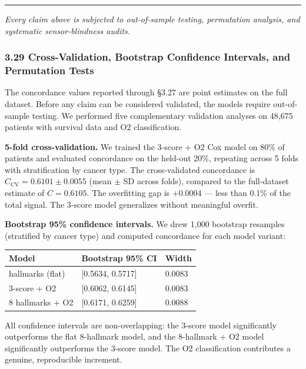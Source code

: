 \documentclass[
  11pt,
]{article}
\newcounter{none} %
\begin{document}
\begin{center}\rule{0.5\linewidth}{0.5pt}\end{center}

\emph{Every claim above is subjected to out-of-sample testing,
permutation analysis, and systematic sensor-blindness audits.}

\subsubsection{3.29 Cross-Validation, Bootstrap Confidence Intervals,
and Permutation
Tests}\label{cross-validation-bootstrap-confidence-intervals-and-permutation-tests}

The concordance values reported through §3.27 are point estimates on the
full dataset. Before any claim can be considered validated, the models
require out-of-sample testing. We performed five complementary
validation analyses on 48,675 patients with survival data and O2
classification.

\textbf{5-fold cross-validation.} We trained the 3-score + O2 Cox model
on 80\% of patients and evaluated concordance on the held-out 20\%,
repeating across 5 folds with stratification by cancer type. The
cross-validated concordance is \(C_\mathrm{CV} = 0.6101 \pm 0.0055\)
(mean \(\pm\) SD across folds), compared to the full-dataset estimate of
\(C = 0.6105\). The overfitting gap is \(+0.0004\) --- less than 0.1\%
of the total signal. The 3-score model generalizes without meaningful
overfit.

\textbf{Bootstrap 95\% confidence intervals.} We drew 1,000 bootstrap
resamples (stratified by cancer type) and computed concordance for each
model variant:

{\def\LTcaptype{none} %
\begin{longtable}[]{@{}lll@{}}
\toprule\noalign{}
Model & Bootstrap 95\% CI & Width \\
\midrule\noalign{}
\endhead
\bottomrule\noalign{}
\endlastfoot
8 hallmarks (flat) & {[}0.5634, 0.5717{]} & 0.0083 \\
3-score + O2 & {[}0.6062, 0.6145{]} & 0.0083 \\
8 hallmarks + O2 & {[}0.6171, 0.6259{]} & 0.0088 \\
\end{longtable}
}

All confidence intervals are non-overlapping: the 3-score model
significantly outperforms the flat 8-hallmark model, and the 8-hallmark
+ O2 model significantly outperforms the 3-score model. The O2
classification contributes a genuine, reproducible increment.
\end{document}
